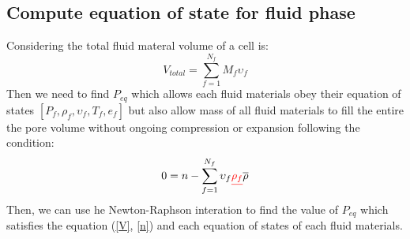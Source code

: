 \documentclass[preprint,12pt]{elsarticle}
\providecommand{\DIFdel}[1]{{\protect\color{red}\sout{#1}}}                      %
\providecommand{\DIFaddbegin}{} %
\providecommand{\DIFaddend}{} %
\providecommand{\DIFdelbegin}{} %
\providecommand{\DIFdelend}{} %
\newcommand{\DIFscaledelfig}{0.5}
\newlength{\DIFdelgraphicswidth} %
\newlength{\DIFdelgraphicsheight} %
\newcommand{\DIFaddincludegraphics}[2][]{{\color{blue}\fbox{\DIFOincludegraphics[#1]{#2}}}} %
\newcommand{\DIFdelincludegraphics}[2][]{%
\sbox{\DIFdelgraphicsbox}{\DIFOincludegraphics[#1]{#2}}%
\settoboxwidth{\DIFdelgraphicswidth}{\DIFdelgraphicsbox} %
\settoboxtotalheight{\DIFdelgraphicsheight}{\DIFdelgraphicsbox} %
\scalebox{\DIFscaledelfig}{%
\parbox[b]{\DIFdelgraphicswidth}{\usebox{\DIFdelgraphicsbox}\\[-\baselineskip] \rule{\DIFdelgraphicswidth}{0em}}\llap{\resizebox{\DIFdelgraphicswidth}{\DIFdelgraphicsheight}{%
\setlength{\unitlength}{\DIFdelgraphicswidth}%
\begin{picture}(1,1)%
\thicklines\linethickness{2pt} %
{\color[rgb]{1,0,0}\put(0,0){\framebox(1,1){}}}%
{\color[rgb]{1,0,0}\put(0,0){\line( 1,1){1}}}%
{\color[rgb]{1,0,0}\put(0,1){\line(1,-1){1}}}%
\end{picture}%
}\hspace*{3pt}}} %
} %
\DeclareRobustCommand{\DIFaddbegin}{\DIFOaddbegin \let\includegraphics\DIFaddincludegraphics} %
\DeclareRobustCommand{\DIFaddend}{\DIFOaddend \let\includegraphics\DIFOincludegraphics} %
\DeclareRobustCommand{\DIFdelbegin}{\DIFOdelbegin \let\includegraphics\DIFdelincludegraphics} %
\DeclareRobustCommand{\DIFdelend}{\DIFOaddend \let\includegraphics\DIFOincludegraphics} %
\begin{document}
\subsection{\textsf{Compute equation of state for fluid phase}}
Considering the total fluid materal volume of a cell is:
%
%
\begin{equation}
\label{V}
    V_{total} = \sum_{f=1}^{N_f} M_f \upsilon_f 
\end{equation}
%
%
Then we need to find $P_{eq}$ which allows each fluid materials obey their equation of states $[P_f, \rho_f, \upsilon_f, T_f, e_f]$ but also allow mass of all fluid materials to fill the entire the pore volume without ongoing compression or expansion following the condition:
%
%
\begin{equation}
    0 = n - \sum_{f=1}^{N_f} \upsilon_f \DIFdelbegin \DIFdel{\rho_f}\DIFdelend \DIFaddbegin \overline{\rho}\DIFaddend \\
\label{n}
\end{equation}
%
%
Then, we can use he Newton-Raphson interation to find the value of $P_{eq}$ which satisfies the equation (\ref{V}, \ref{n}) and each equation of states of each fluid materials.
\end{document}
